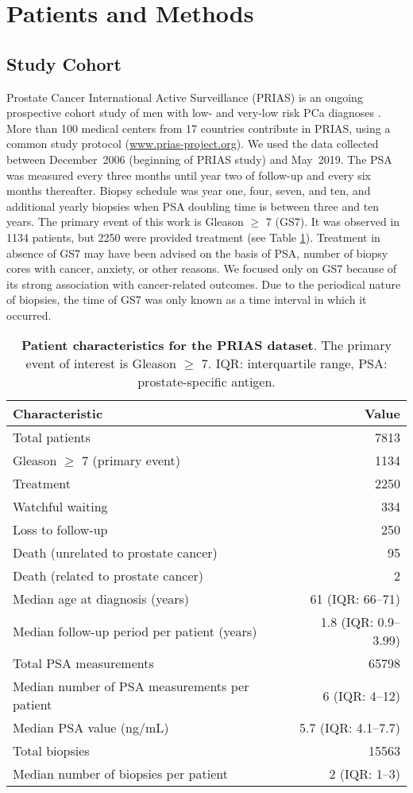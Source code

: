 \section{Patients and Methods}

\subsection{Study Cohort}
Prostate Cancer International Active Surveillance (PRIAS) is an ongoing prospective cohort study of men with low- and very-low risk PCa diagnoses \cite{bul2013active}. More than 100 medical centers from 17 countries contribute in PRIAS, using a common study protocol (\url{www.prias-project.org}). We used the data collected between December~2006 (beginning of PRIAS study) and May~2019. The PSA was measured every three months until year two of follow-up and every six months thereafter. Biopsy schedule was year one, four, seven, and ten, and additional yearly biopsies when PSA doubling time is between three and ten years. The primary event of this work is Gleason $\geq$ 7 (GS7). It was observed in 1134 patients, but 2250 were provided treatment (see Table \ref{table:prias_summary}). Treatment in absence of GS7 may have been advised on the basis of PSA, number of biopsy cores with cancer, anxiety, or other reasons. We focused only on GS7 because of its strong association with cancer-related outcomes. Due to the periodical nature of biopsies, the time of GS7 was only known as a time interval in which it occurred.

\begin{table}
\small\sf\centering
\caption{\textbf{Patient characteristics for the PRIAS dataset}. The primary event of interest is Gleason $\geq$ 7. IQR: interquartile range, PSA: prostate-specific antigen.}
\label{table:prias_summary}
\begin{tabular}{lr}
\hline
\hline
Characteristic & Value\\
\hline
Total patients & 7813\\
Gleason $\geq$ 7 (primary event) & 1134\\
Treatment & 2250\\
Watchful waiting & 334\\
Loss to follow-up & 250\\
Death (unrelated to prostate cancer) & 95\\
Death (related to prostate cancer) & 2\\
\hline
Median age at diagnosis (years) & 61 (IQR: 66--71)\\
Median follow-up period per patient (years) &  1.8 (IQR: 0.9--3.99)\\
Total PSA measurements & 65798\\
Median number of PSA measurements per patient &  6 (IQR: 4--12)\\
Median PSA value (ng/mL) & 5.7 (IQR: 4.1--7.7)\\
Total biopsies & 15563\\
Median number of biopsies per patient &  2 (IQR: 1--3)\\
\hline
\end{tabular}
\end{table}